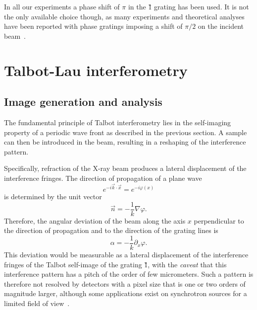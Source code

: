 In all our experiments a phase shift of $\pi$ in the \G1 grating has been
used. It is not the only available choice though, as many experiments and theoretical
analyses have been reported
with phase gratings imposing a shift of $\pi/2$ on the incident
beam~\parencite{Hipp:14,Wang20102,Thuering2014}.


\section{Talbot-Lau interferometry}
\subsection{Image generation and analysis}\label{sec:gi-image-analysis}
The fundamental principle of Talbot interferometry lies in the self-imaging
property of a periodic wave front as described in the previous section. A
sample can then be introduced in the beam, resulting in a reshaping of the
interference pattern.

Specifically, refraction of the X-ray beam produces a lateral displacement
of the interference fringes. The direction of propagation of a plane wave
\begin{equation}
    e^{-i \vec{k} \cdot \vec{x}} = e^{-i\varphi(x)}
    \label{eq:plane.wave}
\end{equation}
is determined by the unit vector
\begin{equation}
    \vec{n} = -\frac{1}{k} \nabla\varphi.
    \label{eq:plane.wave.direction}
\end{equation}
Therefore, the angular deviation of the beam along the axis $x$ perpendicular to
the direction of propagation and to the direction of the grating lines is
\begin{equation}
        \alpha = -\frac{1}{k} \partial_x\varphi.\label{eq:refraction.angle}
\end{equation}
This deviation would be measurable as a lateral displacement of the
interference fringes of the Talbot self-image of the grating \G1, with the
\emph{caveat} that this interference pattern has a pitch of the order of
few micrometers. Such a pattern is therefore not resolved by detectors with a pixel size
that is one or two orders of magnitude larger, although some applications
exist on synchrotron sources for a limited field of
view~\parencite{Cartier:yn5011}.

